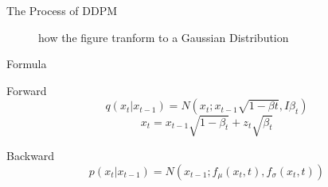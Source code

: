 \documentclass[aspectratio=169]{beamer}
\begin{document}
\begin{frame}{The Process of DDPM}
\begin{figure}[htbp]
{\begin{minipage}[b]{.3\linewidth}
            \end{minipage}
        }
        \caption{how the figure tranform to a Gaussian Distribution}
    \end{figure}
\end{frame}

\begin{frame}{Formula}
    \begin{block}{Forward}
        \begin{equation}
            q(x_t|x_{t-1}) = N(x_t;x_{t-1}\sqrt{1-\beta t}, I\beta_t)
        \end{equation}
        \begin{equation}
            x_t = x_{t-1} \sqrt{1-\beta_t} +  z_t\sqrt{\beta_t}
        \end{equation}
    \end{block}
    \begin{block}{Backward}
        \begin{equation}
            p(x_t|x_{t-1}) = N(x_{t-1};f_\mu(x_t, t),f_\sigma(x_t, t))
        \end{equation}
    \end{block}
\end{frame}
\end{document}
